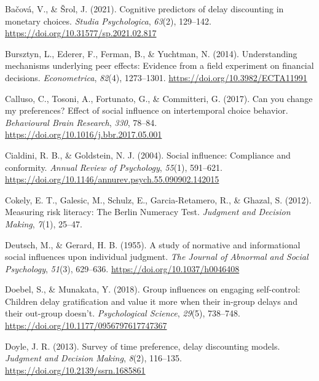 \documentclass[
  pub,floatsintext]{apa6}
\newlength{\cslhangindent}
\newlength{\cslentryspacingunit} %
\newenvironment{CSLReferences}[2] %
 {%
  \setlength{\parindent}{0pt}
  \ifodd #1
  \let\oldpar\par
  \def\par{\hangindent=\cslhangindent\oldpar}
  \fi
  \setlength{\parskip}{#2\cslentryspacingunit}
 }%
 {}
\begin{document}
\scriptsize

\hypertarget{refs}{}
\begin{CSLReferences}{1}{0}
\leavevmode{}%
Bačová, V., \& Šrol, J. (2021). Cognitive predictors of delay discounting in monetary choices. \emph{Studia Psychologica}, \emph{63}(2), 129--142. \url{https://doi.org/10.31577/sp.2021.02.817}

\leavevmode{}%
Bursztyn, L., Ederer, F., Ferman, B., \& Yuchtman, N. (2014). Understanding mechanisms underlying peer effects: {Evidence} from a field experiment on financial decisions. \emph{Econometrica}, \emph{82}(4), 1273--1301. \url{https://doi.org/10.3982/ECTA11991}

\leavevmode{}%
Calluso, C., Tosoni, A., Fortunato, G., \& Committeri, G. (2017). Can you change my preferences? {Effect} of social influence on intertemporal choice behavior. \emph{Behavioural Brain Research}, \emph{330}, 78--84. \url{https://doi.org/10.1016/j.bbr.2017.05.001}

\leavevmode{}%
Cialdini, R. B., \& Goldstein, N. J. (2004). Social influence: {Compliance} and conformity. \emph{Annual Review of Psychology}, \emph{55}(1), 591--621. \url{https://doi.org/10.1146/annurev.psych.55.090902.142015}

\leavevmode{}%
Cokely, E. T., Galesic, M., Schulz, E., Garcia-Retamero, R., \& Ghazal, S. (2012). Measuring risk literacy: {The Berlin Numeracy Test}. \emph{Judgment and Decision Making}, \emph{7}(1), 25--47.

\leavevmode{}%
Deutsch, M., \& Gerard, H. B. (1955). A study of normative and informational social influences upon individual judgment. \emph{The Journal of Abnormal and Social Psychology}, \emph{51}(3), 629--636. \url{https://doi.org/10.1037/h0046408}

\leavevmode{}%
Doebel, S., \& Munakata, Y. (2018). Group influences on engaging self-control: {Children} delay gratification and value it more when their in-group delays and their out-group doesn't. \emph{Psychological Science}, \emph{29}(5), 738--748. \url{https://doi.org/10.1177/0956797617747367}

\leavevmode{}%
Doyle, J. R. (2013). Survey of time preference, delay discounting models. \emph{Judgment and Decision Making}, \emph{8}(2), 116--135. \url{https://doi.org/10.2139/ssrn.1685861}


\end{CSLReferences}
\end{document}
